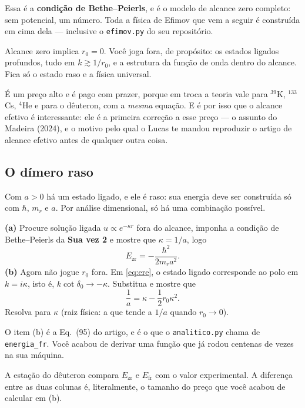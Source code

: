 \documentclass[11pt,a4paper]{article}
\begin{document}
Essa é a \textbf{condição de Bethe--Peierls}, e é o modelo de alcance zero completo:
sem potencial, um número. Toda a física de Efimov que vem a seguir é construída em
cima dela --- inclusive o \texttt{efimov.py} do seu repositório.

\begin{atencao}
Alcance zero implica $r_{0}=0$. Você joga fora, de propósito:
os estados ligados profundos, tudo em $k \gtrsim 1/r_{0}$, e a estrutura da função de
onda dentro do alcance. Fica só o estado raso e a física universal.

É um preço alto e é pago com prazer, porque em troca a teoria vale para
$^{39}$K, $^{133}$Cs, $^{4}$He e para o dêuteron, com a \emph{mesma} equação. E é
por isso que o alcance efetivo é interessante: ele é a primeira correção a esse
preço --- o assunto do Madeira (2024), e o motivo pelo qual o Lucas te mandou
reproduzir o artigo de alcance efetivo antes de qualquer outra coisa.
\end{atencao}

\subsection{O dímero raso}

Com $a>0$ há um estado ligado, e ele é raso: sua energia deve ser construída só com
$\hbar$, $m_{r}$ e $a$. Por análise dimensional, só há uma combinação possível.

\begin{suavez}
\textbf{(a)} Procure solução ligada $u \propto e^{-\kappa r}$ fora do alcance, imponha
a condição de Bethe--Peierls da \textbf{Sua vez 2} e mostre que $\kappa = 1/a$, logo
\[
E_{\text{zr}} = -\frac{\hbar^{2}}{2m_{r}a^{2}}.
\]
\textbf{(b)} Agora não jogue $r_{0}$ fora. Em \eqref{eq:ere}, o estado ligado
corresponde ao polo em $k = i\kappa$, isto é, $k\cot\delta_{0} \to -\kappa$.
Substitua e mostre que
\[
\frac{1}{a} = \kappa - \frac{1}{2}r_{0}\kappa^{2}.
\]
Resolva para $\kappa$ (raiz física: a que tende a $1/a$ quando $r_{0}\to 0$).

\vspace{2.6cm}
\hrulefill
\end{suavez}

O item (b) é a Eq.~(95) do artigo, e é o que o \texttt{analitico.py} chama de
\texttt{energia\_fr}. Você acabou de derivar uma função que já rodou centenas de vezes
na sua máquina.

\begin{ponte}
A estação do dêuteron compara $E_{\text{zr}}$ e $E_{\text{fr}}$ com o valor
experimental. A diferença entre as duas colunas é, literalmente, o tamanho do preço
que você acabou de calcular em (b).
\end{ponte}
\end{document}
